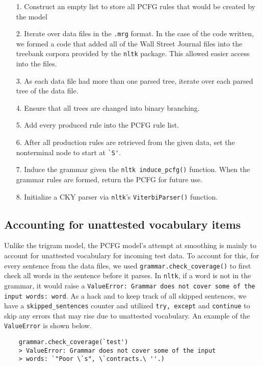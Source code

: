 \documentclass{article}
\begin{document}
\begin{itemize}
    \item [1.] Construct an empty list to store all PCFG rules that would be created by the model 
    \item [2.] Iterate over data files in the \verb|.mrg| format. In the case of the code written, we formed a code that added all of the Wall Street Journal files into the treebank corpora provided by the \verb|nltk| package. This allowed easier access into the files.
    \item [3.] As each data file had more than one parsed tree, iterate over each parsed tree of the data file. 
    \item [4.] Ensure that all trees are changed into binary branching. 
    \item [5.] Add every produced rule into the PCFG rule list. 
    \item [6.] After all production rules are retrieved from the given data, set the nonterminal node to start at \verb|`S'|.
    \item [7.] Induce the grammar given the \verb|nltk induce_pcfg()| function. When the grammar rules are formed, return the PCFG for future use. 
    \item [8.] Initialize a CKY parser via \verb|nltk|'s \verb|ViterbiParser()| function. 
\end{itemize}

\subsection{Accounting for unattested vocabulary items}
Unlike the trigram model, the PCFG model's attempt at smoothing is mainly to account for unattested vocabulary for incoming test data. To account for this, for every sentence from the data files, we used \verb|grammar.check_coverage()| to first check all words in the sentence before it parses. In \verb|nltk|, if a word is not in the grammar, it would raise a \verb|ValueError: Grammar does not cover some of the input words: word|. As a hack and to keep track of all skipped sentences, we have a \verb|skipped_sentences| counter and utilized \verb|try, except| and \verb|continue| to skip any errors that may rise due to unattested vocabulary.  An example of the \verb|ValueError| is shown below.

\begin{verbatim}
    grammar.check_coverage(`test')
    > ValueError: Grammar does not cover some of the input
    > words: `"Poor \`s", \`contracts.\ ''.)
\end{verbatim}
\end{document}
